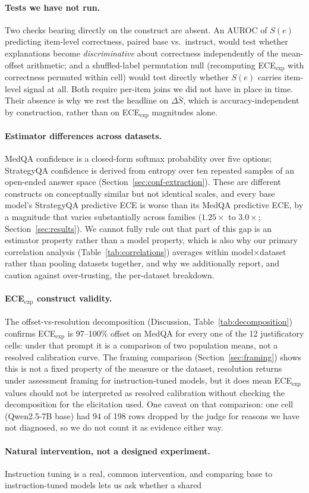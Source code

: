\documentclass[letterpaper]{article} %
\begin{document}
\paragraph{Tests we have not run.} Two checks bearing directly on the construct are absent. An AUROC of $S(e)$ predicting item-level correctness, paired base vs.\ instruct, would test whether explanations become \emph{discriminative} about correctness independently of the mean-offset arithmetic; and a shuffled-label permutation null (recomputing ECE$_{\text{exp}}$ with correctness permuted within cell) would test directly whether $S(e)$ carries item-level signal at all. Both require per-item joins we did not have in place in time. Their absence is why we rest the headline on $\Delta\overline{S}$, which is accuracy-independent by construction, rather than on ECE$_{\text{exp}}$ magnitudes alone. \paragraph{Estimator differences across datasets.} \label{sec:limitations-estimator} MedQA confidence is a closed-form softmax probability over five options; StrategyQA confidence is derived from entropy over ten repeated samples of an open-ended answer space (Section~\ref{sec:conf-extraction}). These are different constructs on conceptually similar but not identical scales, and every base model's StrategyQA predictive ECE is worse than its MedQA predictive ECE, by a magnitude that varies substantially across families ($1.25\times$ to $3.0\times$; Section~\ref{sec:results}). We cannot fully rule out that part of this gap is an estimator property rather than a model property, which is also why our primary correlation analysis (Table~\ref{tab:correlations}) averages within model$\times$dataset rather than pooling datasets together, and why we additionally report, and caution against over-trusting, the per-dataset breakdown. \paragraph{ECE$_{\text{exp}}$ construct validity.} The offset-vs-resolution decomposition (Discussion, Table~\ref{tab:decomposition}) confirms ECE$_{\text{exp}}$ is 97--100\% offset on MedQA for every one of the 12 justificatory cells: under that prompt it is a comparison of two population means, not a resolved calibration curve. The framing comparison (Section~\ref{sec:framing}) shows this is not a fixed property of the measure or the dataset, resolution returns under assessment framing for instruction-tuned models, but it does mean ECE$_{\text{exp}}$ values should not be interpreted as resolved calibration without checking the decomposition for the elicitation used. One caveat on that comparison: one cell (Qwen2.5-7B base) had 94 of 198 rows dropped by the judge for reasons we have not diagnosed, so we do not count it as evidence either way. \paragraph{Natural intervention, not a designed experiment.} Instruction tuning is a real, common intervention, and comparing base to instruction-tuned models lets us ask whether a shared 
\end{document}
